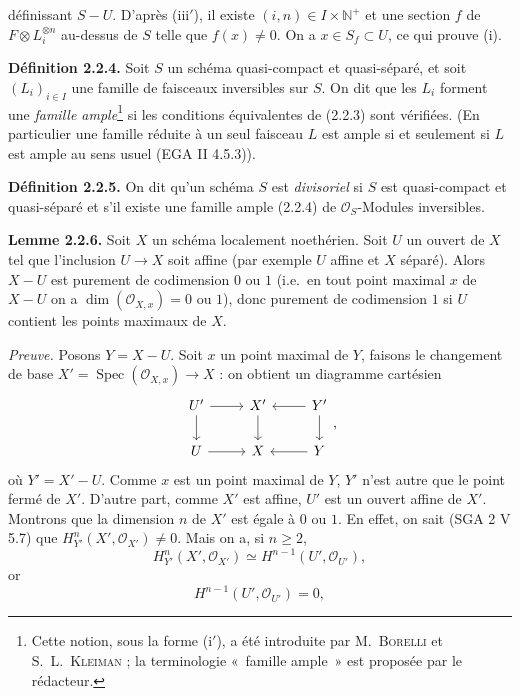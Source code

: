 définissant $S-U$. D'après (iii$'$), il existe $(i,n)\in I\times\mathbb N^+$ et une section $f$ de $F\otimes L_i^{\otimes n}$ au-dessus de $S$ telle que $f(x)\ne0$. On a $x\in S_f\subset U$, ce qui prouve (i).

\textbf{Définition 2.2.4.} Soit $S$ un schéma quasi-compact et quasi-séparé, et soit $(L_i)_{i\in I}$ une famille de faisceaux inversibles sur $S$. On dit que les $L_i$ forment une \emph{famille ample}\footnote{Cette notion, sous la forme (i$'$), a été introduite par M.~\textsc{Borelli} et S.~L.~\textsc{Kleiman} ; la terminologie «~famille ample~» est proposée par le rédacteur.} si les conditions équivalentes de (2.2.3) sont vérifiées. (En particulier une famille réduite à un seul faisceau $L$ est ample si et seulement si $L$ est ample au sens usuel (EGA II 4.5.3)).

\textbf{Définition 2.2.5.} On dit qu'un schéma $S$ est \emph{divisoriel} si $S$ est quasi-compact et quasi-séparé et s'il existe une famille ample (2.2.4) de $\mathcal O_S$-Modules inversibles.

\textbf{Lemme 2.2.6.} Soit $X$ un schéma localement noethérien. Soit $U$ un ouvert de $X$ tel que l'inclusion $U\to X$ soit affine (par exemple $U$ affine et $X$ séparé). Alors $X-U$ est purement de codimension $0$ ou $1$ (i.e.\ en tout point maximal $x$ de $X-U$ on a $\dim(\mathcal O_{X,x})=0$ ou $1$), donc purement de codimension $1$ si $U$ contient les points maximaux de $X$.

\emph{Preuve.} Posons $Y=X-U$. Soit $x$ un point maximal de $Y$, faisons le changement de base $X'=\operatorname{Spec}(\mathcal O_{X,x})\to X$ : on obtient un diagramme cartésien
\[
\begin{tikzcd}
U' \arrow[r] \arrow[d] & X' \arrow[d] & Y' \arrow[l] \arrow[d] \\
U \arrow[r] & X & Y \arrow[l]
\end{tikzcd},
\]
où $Y'=X'-U$. Comme $x$ est un point maximal de $Y$, $Y'$ n'est autre que le point fermé de $X'$. D'autre part, comme $X'$ est affine, $U'$ est un ouvert affine de $X'$. Montrons que la dimension $n$ de $X'$ est égale à $0$ ou $1$. En effet, on sait (SGA 2 V 5.7) que $H^n_{Y'}(X',\mathcal O_{X'})\ne0$. Mais on a, si $n\ge2$,
\[
H^n_{Y'}(X',\mathcal O_{X'})\simeq H^{n-1}(U',\mathcal O_{U'}),
\]
or
\[
H^{n-1}(U',\mathcal O_{U'})=0,
\]
